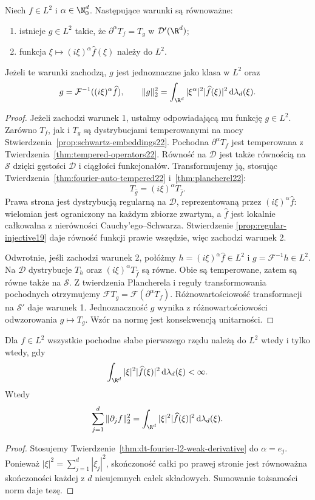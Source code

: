 \begin{twierdzenie}
\label{thm:dt-fourier-l2-weak-derivative}
Niech $f\in L^2$ i $\alpha\in\N_0^d$. Następujące
warunki są równoważne:
\begin{enumerate}
\item istnieje $g\in L^2$ takie, że
$\partial^\alpha T_f=T_g$ w $\mathcal D'(\R^d)$;
\item funkcja $\xi\mapsto(i\xi)^\alpha\widehat f(\xi)$
należy do $L^2$.
\end{enumerate}
Jeżeli te warunki zachodzą, $g$ jest jednoznaczne
jako klasa w $L^2$ oraz
\[
 g=\mathcal F^{-1}((i\xi)^\alpha\widehat f),\qquad
 \|g\|_2^2=\int_{\R^d}|\xi^\alpha|^2|\widehat f(\xi)|^2
 \,\mathrm d\lambda_d(\xi).
\]
\end{twierdzenie}
\begin{proof}
Jeżeli zachodzi warunek 1, ustalmy odpowiadającą mu
funkcję $g\in L^2$. Zarówno $T_f$, jak i $T_g$ są
dystrybucjami temperowanymi na mocy
Stwierdzenia~\ref{prop:schwartz-embeddings22}.
Pochodna $\partial^\alpha T_f$ jest temperowana z
Twierdzenia~\ref{thm:tempered-operators22}.
Równość na $\mathcal D$
jest także równością na $\mathcal S$ dzięki gęstości
$\mathcal D$ i ciągłości funkcjonałów.
Transformujemy ją, stosując
Twierdzenia~\ref{thm:fourier-auto-tempered22}
i~\ref{thm:plancherel22}:
\[
 T_{\widehat g}=(i\xi)^\alpha T_{\widehat f}.
\]
Prawa strona jest dystrybucją regularną na $\mathcal D$,
reprezentowaną przez $(i\xi)^\alpha\widehat f$:
wielomian jest ograniczony na każdym zbiorze zwartym,
a $\widehat f$ jest lokalnie całkowalna z nierówności
Cauchy'ego--Schwarza. Stwierdzenie
\ref{prop:regular-injective19} daje równość funkcji
prawie wszędzie, więc zachodzi warunek 2.

Odwrotnie, jeśli zachodzi warunek 2, połóżmy
$h=(i\xi)^\alpha\widehat f\in L^2$ i
$g=\mathcal F^{-1}h\in L^2$.
Na $\mathcal D$ dystrybucje $T_h$ oraz
$(i\xi)^\alpha T_{\widehat f}$ są równe.
Obie są temperowane, zatem są równe także na $\mathcal S$.
Z twierdzenia Plancherela i reguły transformowania
pochodnych otrzymujemy
$\mathcal F T_g=\mathcal F(\partial^\alpha T_f)$.
Różnowartościowość transformacji na $\mathcal S'$
daje warunek 1. Jednoznaczność $g$ wynika z
różnowartościowości odwzorowania $g\mapsto T_g$.
Wzór na normę jest konsekwencją unitarności.
\end{proof}

\begin{wniosek}
\label{cor:dt-fourier-gradient-energy}
Dla $f\in L^2$ wszystkie pochodne słabe pierwszego
rzędu należą do $L^2$ wtedy i tylko wtedy, gdy
\[
 \int_{\R^d}|\xi|^2|\widehat f(\xi)|^2
 \,\mathrm d\lambda_d(\xi)<\infty.
\]
Wtedy
\[
 \sum_{j=1}^d\|\partial_j f\|_2^2
 =\int_{\R^d}|\xi|^2|\widehat f(\xi)|^2
 \,\mathrm d\lambda_d(\xi).
\]
\end{wniosek}
\begin{proof}
Stosujemy Twierdzenie~\ref{thm:dt-fourier-l2-weak-derivative}
do $\alpha=e_j$. Ponieważ $|\xi|^2=\sum_{j=1}^d|\xi_j|^2$,
skończoność całki po prawej stronie jest równoważna
skończoności każdej z $d$ nieujemnych całek składowych.
Sumowanie tożsamości norm daje tezę.
\end{proof}


